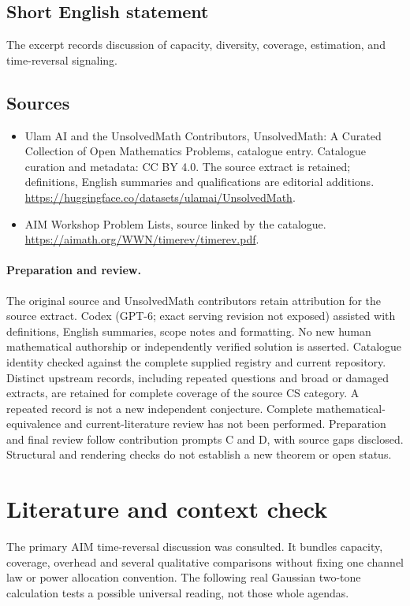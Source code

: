 \documentclass[11pt]{article}
\begin{document}
\subsection{Short English statement}
The excerpt records discussion of capacity, diversity, coverage, estimation, and time-reversal signaling.
\subsection{Sources}
\begin{itemize}
\item[S1] Ulam AI and the UnsolvedMath Contributors, UnsolvedMath: A Curated Collection of Open Mathematics Problems, catalogue entry. Catalogue curation and metadata: CC BY 4.0. The source extract is retained; definitions, English summaries and qualifications are editorial additions.
\url{https://huggingface.co/datasets/ulamai/UnsolvedMath}.
\item[S2] AIM Workshop Problem Lists, source linked by the catalogue.
\url{https://aimath.org/WWN/timerev/timerev.pdf}.
\end{itemize}
\paragraph{Preparation and review.}
The original source and UnsolvedMath contributors retain attribution for the source extract. Codex (GPT-6; exact serving revision not exposed) assisted with definitions, English summaries, scope notes and formatting. No new human mathematical authorship or independently verified solution is asserted. Catalogue identity checked against the complete supplied registry and current repository. Distinct upstream records, including repeated questions and broad or damaged extracts, are retained for complete coverage of the source CS category. A repeated record is not a new independent conjecture. Complete mathematical-equivalence and current-literature review has not been performed. Preparation and final review follow contribution prompts C and D, with source gaps disclosed. Structural and rendering checks do not establish a new theorem or open status.
\label{end:statement}

\section{Literature and context check}
The primary AIM time-reversal discussion was consulted. It bundles capacity,
coverage, overhead and several qualitative comparisons without fixing one
channel law or power allocation convention. The following real Gaussian
two-tone calculation tests a possible universal reading, not those whole agendas.
\end{document}

